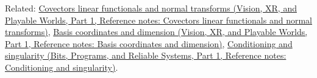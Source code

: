 Related: \href{../07-Vision-XR-and-Playable-Worlds-P01/main.pdf\#nameddest=appendix-46da295c6787}{Covectors linear functionals and normal transforms (Vision, XR, and Playable Worlds, Part 1, Reference notes: Covectors linear functionals and normal transforms)}, \href{../07-Vision-XR-and-Playable-Worlds-P01/main.pdf\#nameddest=appendix-ce0341f7ea0d}{Basis coordinates and dimension (Vision, XR, and Playable Worlds, Part 1, Reference notes: Basis coordinates and dimension)}, \href{../01-Bits-Programs-and-Reliable-Systems-P01/main.pdf\#nameddest=appendix-8f6a01f284a7}{Conditioning and singularity (Bits, Programs, and Reliable Systems, Part 1, Reference notes: Conditioning and singularity)}.
